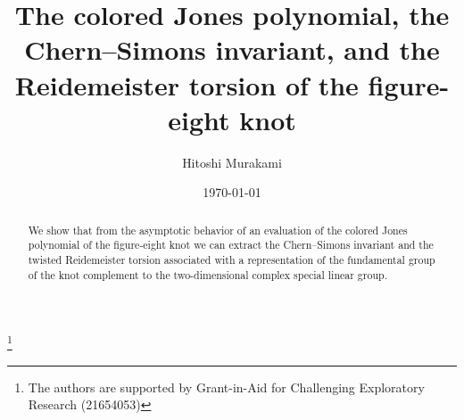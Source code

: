 \documentclass[a4paper]{amsart}
\theoremstyle{plain}
\theoremstyle{definition}
\theoremstyle{remark}
\numberwithin{equation}{section}
\begin{document}
\title[The colored Jones polynomial of the figure-eight knot]
{The colored Jones polynomial, the Chern--Simons invariant, and the Reidemeister torsion of the figure-eight knot}
\author{Hitoshi Murakami}
\address{
Department of Mathematics,
Tokyo Institute of Technology,
Oh-okayama, Meguro, Tokyo 152-8551, Japan
}
\date{\today}
\begin{abstract}
We show that from the asymptotic behavior of an evaluation of the colored Jones polynomial of the figure-eight knot we can extract the Chern--Simons invariant and the twisted Reidemeister torsion associated with a representation of the fundamental group of the knot complement to the two-dimensional complex special linear group.
\end{abstract}
\thanks{The authors are supported by Grant-in-Aid for Challenging Exploratory Research (21654053)}
\maketitle
\end{document}

